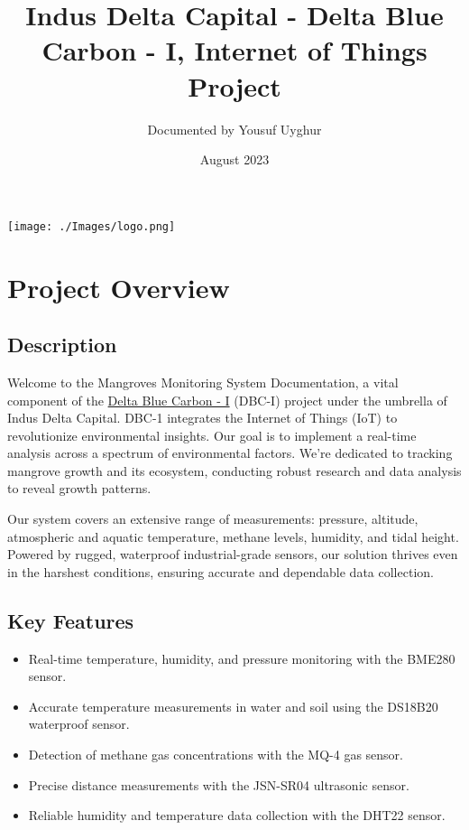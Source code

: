 \documentclass{article}
\begin{document}
\title{Indus Delta Capital - Delta Blue Carbon - I, Internet of Things Project}
\author{Documented by Yousuf Uyghur}
\date{August 2023}

\maketitle

\begin{center}
    \texttt{[image: ./Images/logo.png]}
\end{center}

\pagebreak

\section{Project Overview}

\subsection{Description}

Welcome to the Mangroves Monitoring System Documentation, a vital component of the \href{www.deltabluecarbon.com}{Delta Blue Carbon - I} (DBC-I) project under the umbrella of Indus Delta Capital. DBC-1 integrates the Internet of Things (IoT) to revolutionize environmental insights. Our goal is to implement a real-time analysis across a spectrum of environmental factors. We're dedicated to tracking mangrove growth and its ecosystem, conducting robust research and data analysis to reveal growth patterns.

Our system covers an extensive range of measurements: pressure, altitude, atmospheric and aquatic temperature, methane levels, humidity, and tidal height. Powered by rugged, waterproof industrial-grade sensors, our solution thrives even in the harshest conditions, ensuring accurate and dependable data collection.

\subsection{Key Features}
\begin{itemize}
    \item Real-time temperature, humidity, and pressure monitoring \- with the BME280 sensor.
    \item Accurate temperature measurements in water and soil using the DS18B20 waterproof sensor.
    \item Detection of methane gas concentrations with the MQ-4 gas sensor.
    \item Precise distance measurements with the JSN-SR04 ultrasonic sensor.
    \item Reliable humidity and temperature data collection with the DHT22 sensor.
\end{itemize}
\end{document}

